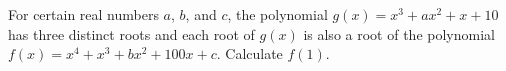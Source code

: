 For certain real numbers $a$, $b$, and $c$, the polynomial $g(x)=x^{3}+ax^{2}+x+10$ has three distinct roots and each root of $g(x)$ is also a root of the polynomial $f(x)=x^{4}+x^{3}+bx^{2}+100x+c$. Calculate $f(1)$.